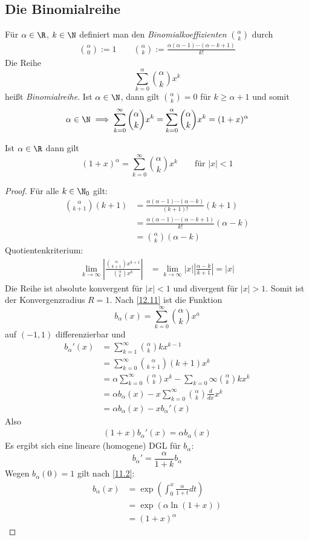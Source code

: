 \documentclass[a4paper,10pt]{scrartcl}
\begin{document}
\subsection{Die Binomialreihe}

Für $\alpha\in\R$, $k\in\N$ definiert man den \emph{Binomialkoeffizienten} $\binom{\alpha}{k}$ durch
\begin{align*}
\binom{\alpha}{0}:= 1 \qquad
\binom{\alpha}{k}:= \frac {\alpha(\alpha-1)\dotsb(\alpha-k+1)}{k!}
\end{align*}
Die Reihe
\[
\sum_{k=0}^\alpha\binom{\alpha}{k}x^k
\]
heißt \emph{Binomialreihe}.
Ist $\alpha\in \N$, dann gilt
$\binom{\alpha}k = 0$ für $k\ge \alpha +1$ und somit
\[
\alpha\in\N \implies \sum_{k=0}^\infty\binom\alpha kx^k=\sum_{k=0}^\alpha\binom \alpha kx^k=(1+x)^\alpha
\]
\setcounter{thm}{14}
\begin{thm}
\label{12.15}
	Ist $\alpha\in\R$ dann gilt
\[
(1+x)^\alpha=\sum_{k=0}^\infty\binom\alpha kx^k \qquad \text{für }|x|<1
\]
\begin{proof}
Für alle $k\in\N_0$ gilt:
\begin{align*}
\binom{\alpha}{k+1}(k+1)&=\frac{\alpha(\alpha-1)\dotsb(\alpha-k)}{(k+1)!}(k+1)\\
&=\frac {\alpha(\alpha-1)\dotsb(\alpha-k+1)}{k!}(\alpha-k)\\
&=\binom{\alpha}k(\alpha-k)
\end{align*}
Quotientenkriterium:
\begin{align*}
\lim_{k\to\infty}\left|\frac{\binom\alpha {k+1}x^{k+1}}{\binom{\alpha}kx^k}\right|&=
\lim_{k\to\infty}|x|\left|\frac{\alpha-k}{k+1}\right|=|x|
\end{align*}
Die Reihe ist absolute konvergent für $|x|<1$ und divergent für $|x|>1$.
Somit ist der Konvergenzradius $R=1$.
Nach \ref{12.11} ist die Funktion
\[
b_\alpha(x)=\sum_{k=0}^\infty\binom\alpha k x^a
\]
auf $(-1,1)$ differenzierbar und
\begin{align*}
b_\alpha'(x)&=\sum_{k=1}^\infty\binom\alpha kkx^{k-1}\\
&=\sum_{k=0}^\infty\binom\alpha{k+1}(k+1)x^k\\
&=\alpha\sum_{k=0}^\infty\binom\alpha kx^k-\sum_{k=0}\infty\binom\alpha kkx^k\\
&= \alpha b_\alpha(x) - x\sum_{k=0}^\infty\binom \alpha k\frac d{dx}x^k\\
&= \alpha b_\alpha(x)-xb_\alpha'(x)
\end{align*}
Also
\begin{align*}
(1+x)b_\alpha'(x)=\alpha b_\alpha(x)
\end{align*}
Es ergibt sich eine lineare (homogene) DGL für $b_\alpha$:
\[
b_\alpha'=\frac \alpha{1+k}b_\alpha
\]
Wegen $b_\alpha(0)=1$ gilt nach \ref{11.2}:
\begin{align*}
b_\alpha(x)&=\exp\left(\int_0^x\frac\alpha{1+t}dt\right)\\
&=\exp(\alpha\ln(1+x))\\
&=(1+x)^\alpha
\end{align*}
\end{proof}


\end{thm}
\end{document}
